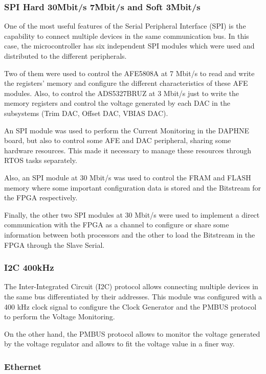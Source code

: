 \subsubsection{SPI Hard 30Mbit/s 7Mbit/s and Soft 3Mbit/s}


One of the most useful features of the Serial Peripheral Interface (SPI) is the capability to connect multiple devices in the same communication bus. In this case, the microcontroller has six independent SPI modules which were used and distributed to the different peripherals. 

Two of them were used to control the AFE5808A at 7 Mbit/s to read and write the registers' memory and configure the different characteristics of these AFE modules. Also, to control the ADS5327BRUZ at 3 Mbit/s just to write the memory registers and control the voltage generated by each DAC in the subsystems (Trim DAC, Offset DAC, VBIAS DAC).

An SPI module was used to perform the Current Monitoring in the DAPHNE board, but also to control some AFE and DAC peripheral, sharing some hardware resources. This made it necessary to manage these resources through RTOS tasks separately. 

Also, an SPI module at 30 Mbit/s was used to control the FRAM and FLASH memory where some important configuration data is stored and the Bitstream for the FPGA respectively.

Finally, the other two SPI modules at 30 Mbit/s were used to implement a direct communication with the FPGA as a channel to configure or share some information between both processors and the other to load the Bitstream in the FPGA through the Slave Serial. 


\subsubsection{I2C 400kHz}

The Inter-Integrated Circuit (I2C) protocol allows connecting multiple devices in the same bus differentiated by their addresses. This module was configured with a 400 kHz clock signal to configure the Clock Generator and the PMBUS protocol to perform the Voltage Monitoring.

On the other hand, the PMBUS protocol allows to monitor the voltage generated by the voltage regulator and allows to fit the voltage value in a finer way.


\subsubsection{Ethernet}

